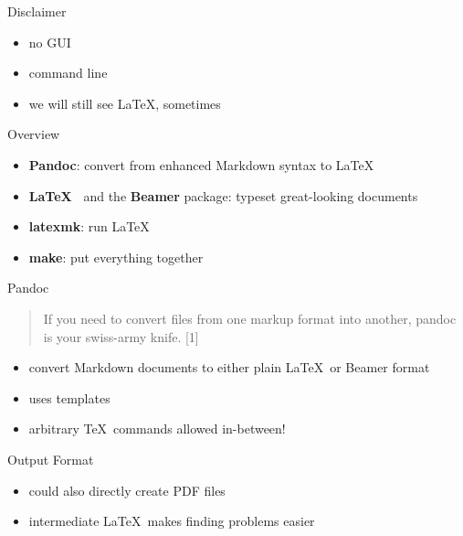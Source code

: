\documentclass[smaller,ignorenonframetext,]{beamer}
\begin{document}
\begin{frame}{Disclaimer}

\begin{itemize}
\itemsep1pt\parskip0pt
\item
  no GUI
\item
  command line
\item
  we will still see \LaTeX, sometimes
\end{itemize}

\end{frame}

\begin{frame}{Overview}

\begin{itemize}
\itemsep1pt\parskip0pt
\item
  \textbf{Pandoc}: convert from enhanced Markdown syntax to \LaTeX
\item
  \textbf{\LaTeX~} and the \textbf{Beamer} package: typeset
  great-looking documents
\item
  \textbf{latexmk}: run \LaTeX
\item
  \textbf{make}: put everything together
\end{itemize}

\end{frame}

\begin{frame}{Pandoc}

\begin{quote}
If you need to convert files from one markup format into another, pandoc
is your swiss-army knife. {[}1{]}
\end{quote}

\begin{itemize}
\itemsep1pt\parskip0pt
\item
  convert Markdown documents to either plain \LaTeX~or Beamer format
\item
  uses templates
\item
  arbitrary \TeX~commands allowed in-between!
\end{itemize}

\begin{block}{Output Format}

\begin{itemize}
\itemsep1pt\parskip0pt
\item
  could also directly create PDF files
\item
  intermediate \LaTeX~makes finding problems easier
\end{itemize}

\end{block}

\end{frame}
\end{document}
